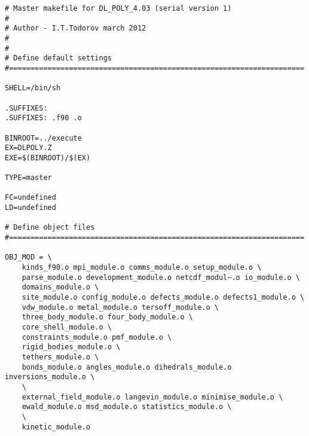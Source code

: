 \begin{verbatim}
# Master makefile for DL_POLY_4.03 (serial version 1)
#
# Author - I.T.Todorov march 2012
#
#
# Define default settings
#=====================================================================

SHELL=/bin/sh

.SUFFIXES:
.SUFFIXES: .f90 .o

BINROOT=../execute
EX=DLPOLY.Z
EXE=$(BINROOT)/$(EX)

TYPE=master

FC=undefined
LD=undefined

# Define object files
#=====================================================================

OBJ_MOD = \
	kinds_f90.o mpi_module.o comms_module.o setup_module.o \
	parse_module.o development_module.o netcdf_modul~.o io_module.o \
	domains_module.o \
	site_module.o config_module.o defects_module.o defects1_module.o \
	vdw_module.o metal_module.o tersoff_module.o \
	three_body_module.o four_body_module.o \
	core_shell_module.o \
	constraints_module.o pmf_module.o \
	rigid_bodies_module.o \
	tethers_module.o \
	bonds_module.o angles_module.o dihedrals_module.o inversions_module.o \
	\
	external_field_module.o langevin_module.o minimise_module.o \
	ewald_module.o msd_module.o statistics_module.o \
	\
	kinetic_module.o


\end{verbatim}
